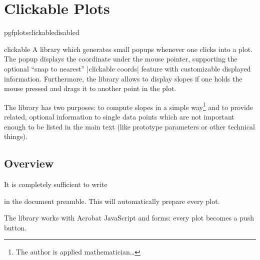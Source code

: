 
\section{Clickable Plots}

\begingroup
\def\pgfplotsmanualcurlibrary{clickable}
    \expandafter\ifx\csname pgfplotsclickabledisabled\endcsname\relax
    \else
    \fi

\begin{pgfplotslibrary}{clickable}
    A library which generates small popups whenever one clicks into a plot. The
    popup displays the coordinate under the mouse pointer, supporting the
    optional ``snap to nearest'' |clickable coords| feature with customizable
    displayed information. Furthermore, the library allows to display slopes if
    one holds the mouse pressed and drags it to another point in the plot.

    The library has two purposes: to compute slopes in a simple
    way\footnote{The author is applied mathematician\ldots} and to provide
    related, optional information to single data points which are not important
    enough to be listed in the main text (like prototype parameters or other
    technical things).
\end{pgfplotslibrary}


\subsection{Overview}

It is completely sufficient to write
%
\begin{codeexample}
\end{codeexample}
%
\noindent in the document preamble. This will automatically prepare every plot.

The library works with Acrobat JavaScript and \pdf{} forms: every plot becomes
a push button.

